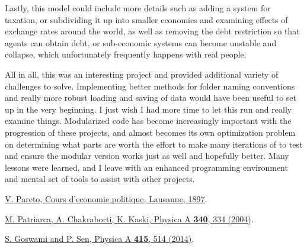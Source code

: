 \documentclass[12pt]{article} %
\begin{document}
Lastly, this model could include more details such as adding a system for
taxation, or subdividing it up into smaller economies and examining effects of
exchange rates around the world, as well as removing the debt restriction so
that agents can obtain debt, or sub-economic systems can become unstable and
collapse, which unfortunately frequently happens with real
people. 

All in all, this was an interesting project and provided additional variety of
challenges to solve. Implementing better methods for folder naming conventions
and really more robust loading and saving of data would have been useful to set
up in the very beginning. I just wish I had more time to let
this run and really examine things. Modularized code has become increasingly
important with the progression of these projects, and almost becomes its own
optimization problem on determining what parts are worth the effort to make
many iterations of to test and ensure the modular version works just as well
and hopefully better. Many lessons were learned, and I leave with an enhanced 
programming environment and mental set of tools to assist with other projects.



\begin{thebibliography}{2} %
\href{{http://www.institutcoppet.org/2012/05/08/cours-deconomie-politique-1896-de-vilfredo-pareto}}{V. Pareto, Cours d'economie politique, Lausanne, 1897}.

\href{{http://www.sciencedirect.com/science/article/pii/S0378437104004327}}{M. Patriarca, A. Chakraborti, K. Kaski, Physica A \textbf{340}, 334 (2004)}.

\href{{http://www.sciencedirect.com/science/article/pii/S0378437114006967}}{S. Goswami and P. Sen, Physica A \textbf{415}, 514 (2014)}.
\end{thebibliography}
\end{document}
